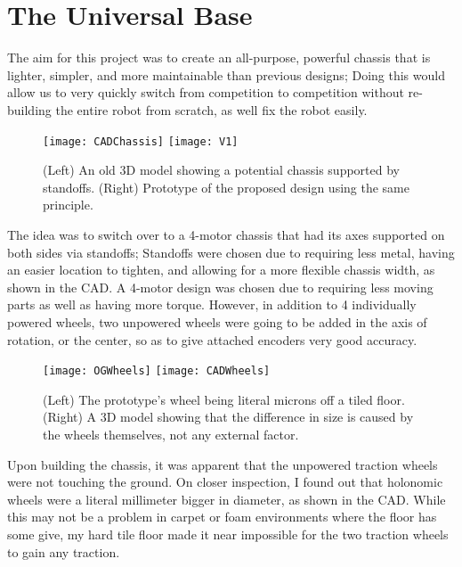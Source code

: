 \section{The Universal Base}
The aim for this project was to create an all-purpose, powerful chassis that is lighter, simpler, and more maintainable than previous designs; Doing this would allow us to very quickly switch from competition to competition without re-building the entire robot from scratch, as well fix the robot easily.

\begin{figure}[h]
    \centering
    \texttt{[image: CADChassis]}
    \texttt{[image: V1]}
    \caption{
        (Left) An old 3D model showing a potential chassis supported by standoffs. (Right) Prototype of the proposed design using the same principle.
    }
\end{figure}

The idea was to switch over to a 4-motor chassis that had its axes supported on both sides via standoffs; Standoffs were chosen due to requiring less metal, having an easier location to tighten, and allowing for a more flexible chassis width, as shown in the CAD. A 4-motor design was chosen due to requiring less moving parts as well as having more torque. However, in addition to 4 individually powered wheels, two unpowered wheels were going to be added in the axis of rotation, or the center, so as to give attached encoders very good accuracy.

\begin{figure}[h]
    \centering
    \texttt{[image: OGWheels]}
    \texttt{[image: CADWheels]}
    \caption{
        (Left) The prototype's wheel being literal microns off a tiled floor. (Right) A 3D model showing that the difference in size is caused by the wheels themselves, not any external factor.
    }
\end{figure}

Upon building the chassis, it was apparent that the unpowered traction wheels were not touching the ground. On closer inspection, I found out that holonomic wheels were a literal millimeter bigger in diameter, as shown in the CAD. While this may not be a problem in carpet or foam environments where the floor has some give, my hard tile floor made it near impossible for the two traction wheels to gain any traction.


